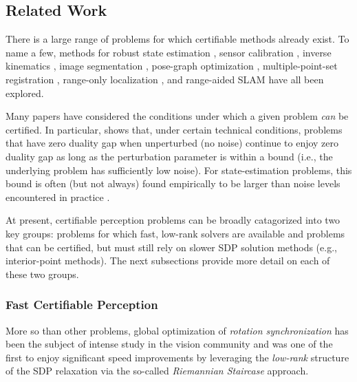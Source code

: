 \documentclass[lettersize,journal]{IEEEtran}
\begin{document}
\subsection{Related Work}

There is a large range of problems for which certifiable methods already exist. To name a few, methods for robust state estimation \cite{yangCertifiablyOptimalOutlierRobust2023,yangTEASERFastCertifiable2021}, sensor calibration \cite{wiseCertifiablyOptimalMonocular2020,giamouConvexIterationDistanceGeometric2022}, inverse kinematics \cite{giamouConvexIterationDistanceGeometric2022}, image segmentation \cite{huAcceleratedInferenceMarkov2019}, pose-graph optimization \cite{rosenSESyncCertifiablyCorrect2019}, multiple-point-set registration \cite{chaudhuryGlobalRegistrationMultiple2015, iglesiasGlobalOptimalityPoint2020}, range-only localization \cite{dumbgenSafeSmoothCertified2023}, and range-aided SLAM \cite{papaliaCertifiablyCorrectRangeAided2023} have all been explored. 

Many papers have considered the conditions under which a given problem \emph{can} be certified. In particular, \cite{cifuentesLocalStabilitySemidefinite2022} shows that, under certain technical conditions, problems that have zero duality gap when unperturbed (no noise) continue to enjoy zero duality gap as long as the perturbation parameter is within a bound (i.e., the underlying problem has sufficiently low noise). For state-estimation problems, this bound is often (but not always) found empirically to be larger than noise levels encountered in practice \cite{rosenSESyncCertifiablyCorrect2019, tianDistributedCertifiablyCorrect2021, erikssonRotationAveragingStrong2018}.

At present, certifiable perception problems can be broadly catagorized into two key groups: problems for which fast, low-rank solvers are available and problems that can be certified, but must still rely on slower SDP solution methods (e.g., interior-point methods). The next subsections provide more detail on each of these two groups.

\subsubsection{Fast Certifiable Perception}\label{sec:FastPerception}

More so than other problems, global optimization of \emph{rotation synchronization} has been the subject of intense study in the vision community \cite{wilsonWhenRotationsAveraging2016, erikssonRotationAveragingStrong2018, brynteTightnessSemidefiniteRelaxations2022} and was one of the first to enjoy significant speed improvements by leveraging the \emph{low-rank} structure of the SDP relaxation via the so-called \emph{Riemannian Staircase} approach\cite{bandeiraTightnessMaximumLikelihood2017, boumalNonconvexBurerMonteiro2016}. 
\end{document}
